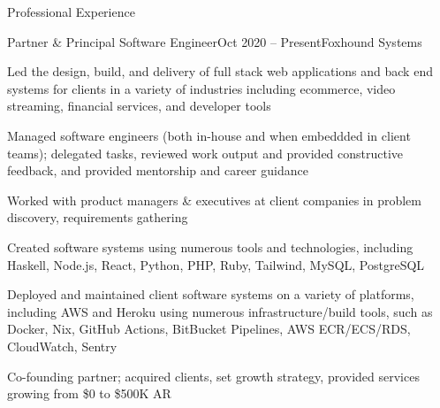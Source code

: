 \documentclass{resume} %
\begin{document}

\begin{rSection}{Professional Experience}

\begin{rSubsection}{Partner \& Principal Software Engineer}{Oct 2020 -- Present}{Foxhound Systems}{}
  \item Led the design, build, and delivery of full stack web applications and back end systems for clients in a variety of industries including ecommerce, video streaming, financial services, and developer tools
  \item Managed software engineers (both in-house and when embeddded in client teams); delegated tasks, reviewed work output and provided constructive feedback, and provided mentorship and career guidance
  \item Worked with product managers \& executives at client companies in problem discovery, requirements gathering
  \item Created software systems using numerous tools and technologies, including Haskell, Node.js, React, Python, PHP, Ruby, Tailwind, MySQL, PostgreSQL
  \item Deployed and maintained client software systems on a variety of platforms, including AWS and Heroku using numerous infrastructure/build tools, such as Docker, Nix, GitHub Actions, BitBucket Pipelines, AWS ECR/ECS/RDS, CloudWatch, Sentry
  \item Co-founding partner; acquired clients, set growth strategy, provided services growing from \$0 to \$500K AR
\end{rSubsection}



\end{rSection}
\end{document}
